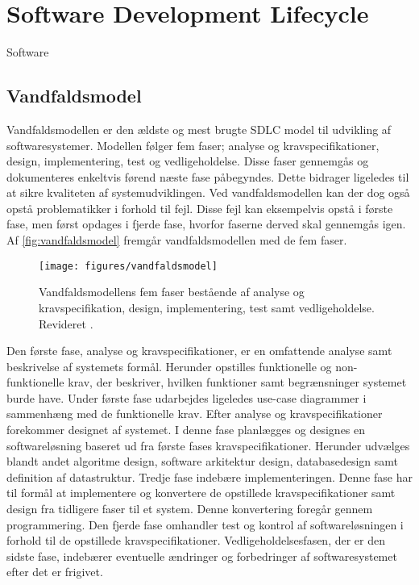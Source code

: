 \section{Software Development Lifecycle}
Software 


\subsection{Vandfaldsmodel}
Vandfaldsmodellen er den ældste og mest brugte SDLC model til udvikling af softwaresystemer. Modellen følger fem faser; analyse og kravspecifikationer, design, implementering, test og vedligeholdelse. Disse faser gennemgås og dokumenteres enkeltvis førend næste fase påbegyndes. Dette bidrager ligeledes til at sikre kvaliteten af systemudviklingen. Ved vandfaldsmodellen kan der dog også opstå problematikker i forhold til fejl. Disse fejl kan eksempelvis opstå i første fase, men først opdages i fjerde fase, hvorfor faserne derved skal gennemgås igen.\cite{Alshamrani2015,Bassil2012} Af \autoref{fig:vandfaldsmodel} fremgår vandfaldsmodellen med de fem faser. 

\begin{figure} [H]
\centering
\texttt{[image: figures/vandfaldsmodel]}
\caption{Vandfaldsmodellens fem faser bestående af analyse og kravspecifikation, design, implementering, test samt vedligeholdelse. Revideret \cite{Alshamrani2015,Bassil2012}.}
\label{fig:vandfaldsmodel}
\end{figure} 

Den første fase, analyse og kravspecifikationer, er en omfattende analyse samt beskrivelse af systemets formål. Herunder opstilles funktionelle og non-funktionelle krav, der beskriver, hvilken funktioner samt begrænsninger systemet burde have. Under første fase udarbejdes ligeledes use-case diagrammer i sammenhæng med de funktionelle krav. Efter analyse og kravspecifikationer forekommer designet af systemet. I denne fase planlægges og designes en softwareløsning baseret ud fra første fases kravspecifikationer. Herunder udvælges blandt andet algoritme design, software arkitektur design, databasedesign samt definition af datastruktur. Tredje fase indebære implementeringen. Denne fase har til formål at implementere og konvertere de opstillede kravspecifikationer samt design fra tidligere faser til et system. Denne konvertering foregår gennem programmering. Den fjerde fase omhandler test og kontrol af softwareløsningen i forhold til de opstillede kravspecifikationer. Vedligeholdelsesfasen, der er den sidste fase, indebærer eventuelle ændringer og forbedringer af softwaresystemet efter det er frigivet.\cite{Alshamrani2015,Bassil2012}








